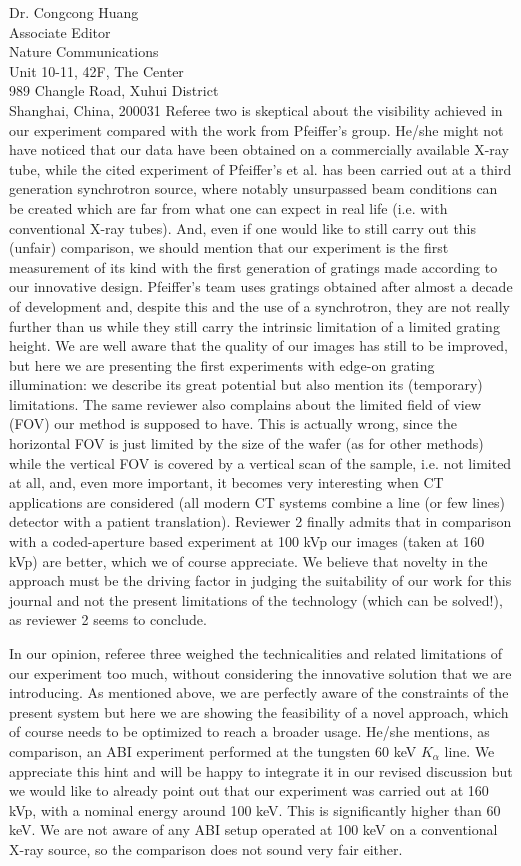 \documentclass[a4paper,english]{scrlttr2}
\begin{document}
\begin{letter}{Dr. Congcong Huang\\

Associate Editor\\
Nature Communications \\

Unit 10-11, 42F, The Center\\
989 Changle Road, Xuhui District\\
Shanghai, China, 200031}
Referee two is skeptical about the visibility achieved in our experiment compared with
the work from Pfeiffer's group. He/she might not have noticed that our data have been
obtained on a commercially available X-ray tube, while the cited experiment of Pfeiffer's
et al. has been carried out at a third generation synchrotron source, where notably
unsurpassed beam conditions can be created which are far from what one can expect in
real life (i.e. with conventional X-ray tubes). And, even if one would like to still carry out
this (unfair) comparison, we should mention that our experiment is the first measurement
of its kind with the first generation of gratings made according to our innovative design.
Pfeiffer's team uses gratings obtained after almost a decade of development and, despite
this and the use of a synchrotron, they are not really further than us while they still carry
the intrinsic limitation of a limited grating height. We are well aware that the quality of
our images has still to be improved, but here we are presenting the first experiments with
edge-on grating illumination: we describe its great potential but also mention its
(temporary) limitations. The same reviewer also complains about the limited field of
view (FOV) our method is supposed to have. This is actually wrong, since the horizontal
FOV is just limited by the size of the wafer (as for other methods) while the vertical FOV
is covered by a vertical scan of the sample, i.e. not limited at all, and, even more
important, it becomes very interesting when CT applications are considered (all modern
CT systems combine a line (or few lines) detector with a patient translation). Reviewer 2
finally admits that in comparison with a coded-aperture based experiment at 100 kVp our
images (taken at 160 kVp) are better, which we of course appreciate. We believe that
novelty in the approach must be the driving factor in judging the suitability of our work
for this journal and not the present limitations of the technology (which can be solved!),
as reviewer 2 seems to conclude.

In our opinion, referee three weighed the technicalities and related limitations of our
experiment too much, without considering the innovative solution that we are
introducing. As mentioned above, we are perfectly aware of the constraints of the present
system but here we are showing the feasibility of a novel approach, which of course
needs to be optimized to reach a broader usage. He/she mentions, as comparison, an ABI
experiment performed at the tungsten 60 keV $K_\alpha$ line. We appreciate this hint and
will be happy to integrate it in our revised discussion but we would like to already point
out that our experiment was carried out at 160 kVp, with a nominal energy around 100
keV. This is significantly higher than 60 keV. We are not aware of any ABI setup
operated at 100 keV on a conventional X-ray source, so the comparison does not sound
very fair either.


\end{letter}
\end{document}
